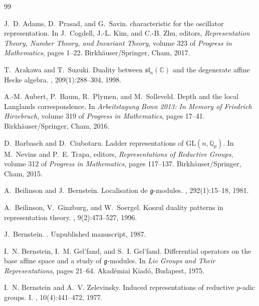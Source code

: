 \documentclass[10pt,a4paper]{article}
\theoremstyle{definition}
\theoremstyle{remark}
\numberwithin{equation}{section}
\begin{document}
\begin{thebibliography}{99}

J.~D. Adams, D.~Prasad, and G.~Savin.
 characteristic for the oscillator
  representation.
\newblock In J.~Cogdell, J.-L. Kim, and C.-B. Zhu, editors, {\em Representation
  Theory, Number Theory, and Invariant Theory}, volume 323 of {\em Progress in
  Mathematics}, pages 1--22. Birkh{\"a}user/Springer, Cham, 2017.

T.~Arakawa and T.~Suzuki.
\newblock Duality between {$\mathfrak{sl}_n(\mathbb C)$} and the
  degenerate affine {Hecke} algebra.
, 209(1):288--304, 1998.

A.-M. Aubert, P.~Baum, R.~Plymen, and M.~Solleveld.
\newblock Depth and the local {Langlands} correspondence.
\newblock In {\em Arbeitstagung Bonn 2013: In Memory of Friedrich Hirzebruch},
  volume 319 of {\em Progress in Mathematics}, pages 17--41.
  Birkh{\"a}user/Springer, Cham, 2016.


D.~Barbasch and D.~Ciubotaru.
\newblock Ladder representations of {$\mathrm{GL}(n,\mathbb{Q}_p)$}.
\newblock In M.~Nevins and P.~E. Trapa, editors, {\em Representations of
  Reductive Groups}, volume 312 of {\em Progress in Mathematics}, pages
  117--137. Birkh{\"a}user/Springer, Cham, 2015.

A.~Beilinson and J.~Bernstein.
\newblock Localisation de {$\mathfrak g$}-modules.
, 292(1):15--18, 1981.

A.~Beilinson, V.~Ginzburg, and W.~Soergel.
\newblock Koszul duality patterns in representation theory.
, 9(2):473--527, 1996.

J.~Bernstein.
.
\newblock Unpublished manuscript, 1987.

I.~N. Bernstein, I.~M. Gel'fand, and S.~I. Gel'fand.
\newblock Differential operators on the base affine space and a study of
  {$\mathfrak g$}-modules.
\newblock In {\em Lie Groups and Their Representations}, pages 21--64.
  Akad{\'e}miai Kiad{\'o}, Budapest, 1975.

I.~N. Bernstein and A.~V. Zelevinsky.
\newblock Induced representations of reductive {$p$}-adic groups. {I}.
, 10(4):441--472, 1977.


\end{thebibliography}
\end{document}
